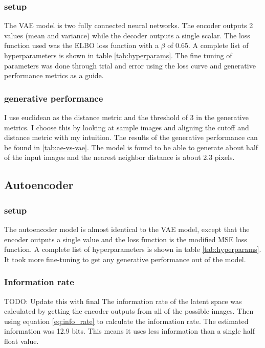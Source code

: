 \documentclass[conference,a4paper]{IEEEtran}
\begin{document}
\subsubsection{setup}

The VAE model is two fully connected neural networks. The encoder outputs 2 values (mean and variance) while the decoder outputs a single scalar. The loss function used was the ELBO loss function with a $\beta$ of 0.65. A complete list of hyperparameters is shown in table \ref{tab:hyperparams}. The fine tuning of parameters was done through trial and error using the loss curve and generative performance metrics as a guide.

\subsubsection{generative performance}

I use euclidean as the distance metric and the threshold of 3 in the generative metrics. I choose this by looking at sample images and aligning the cutoff and distance metric with my intuition. The results of the generative performance can be found in \ref{tab:ae-vs-vae}. The model is found to be able to generate about half of the input images and the nearest neighbor distance is about 2.3 pixels.

\subsection{Autoencoder}

\subsubsection{setup}
The autoencoder model is almost identical to the VAE model, except that the encoder outputs a single value and the loss function is the modified MSE loss function. A complete list of hyperparameters is shown in table \ref{tab:hyperparams}. It took more fine-tuning to get any generative performance out of the model.

\subsubsection{Information rate}

TODO: Update this with final
The information rate of the latent space was calculated by getting the encoder outputs from all of the possible images. Then using equation \ref{eq:info_rate} to calculate the information rate. The estimated information was 12.9 bits. This means it uses less information than a single half float value.
\end{document}
